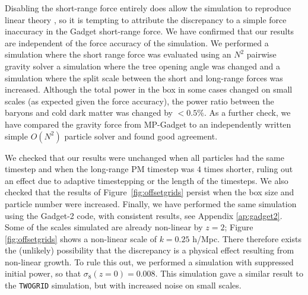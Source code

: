 \documentclass[a4paper,11pt]{article}
\begin{document}
Disabling the short-range force entirely does allow the simulation to reproduce linear theory \cite{Angulo:2013}, so it is tempting to attribute the discrepancy to a simple force inaccuracy in the Gadget short-range force. We have confirmed that our results are independent of the force accuracy of the simulation. We performed a simulation where the short range force was evaluated using an $N^2$ pairwise gravity solver a simulation where the tree opening angle was changed and a simulation where the split scale between the short and long-range forces was increased. Although the total power in the box in some cases changed on small scales (as expected given the force accuracy), the power ratio between the baryons and cold dark matter was changed by $<0.5\%$. As a further check, we have compared the gravity force from MP-Gadget to an independently written simple $O(N^2)$ particle solver and found good agreement.

We checked that our results were unchanged when all particles had the same timestep and when the long-range PM timestep was $4$ times shorter, ruling out an effect due to adaptive timestepping or the length of the timesteps. We also checked that the results of Figure~\ref{fig:offsetgrids} persist when the box size and particle number were increased. Finally, we have performed the same simulation using the Gadget-2 code, with consistent results, see Appendix \ref{ap:gadget2}. Some of the scales simulated are already non-linear by $z=2$; Figure \ref{fig:offsetgrids} shows a non-linear scale of $k = 0.25$ h/Mpc. There therefore exists the (unlikely) possibility that the discrepancy is a physical effect resulting from non-linear growth. To rule this out, we performed a simulation with suppressed initial power, so that $\sigma_8(z=0) = 0.008$. This simulation gave a similar result to the \texttt{TWOGRID} simulation, but with increased noise on small scales.
\end{document}
